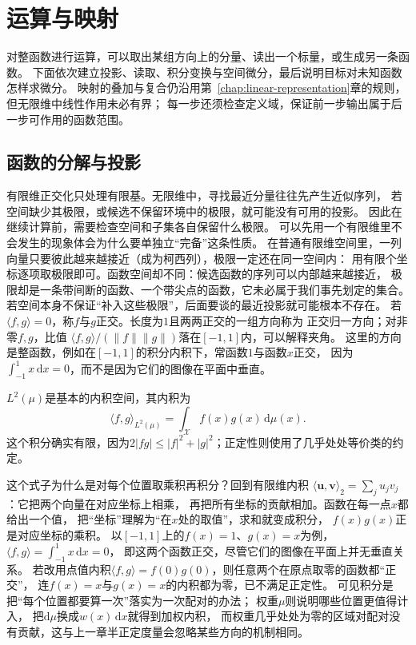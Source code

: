 \section{运算与映射}
\label{sec:functional-operators}

对整函数进行运算，可以取出某组方向上的分量、读出一个标量，或生成另一条函数。
下面依次建立投影、读取、积分变换与空间微分，最后说明目标对未知函数怎样求微分。
映射的叠加与复合仍沿用第~\ref{chap:linear-representation}章的规则，但无限维中线性作用未必有界；
每一步还须检查定义域，保证前一步输出属于后一步可作用的函数范围。

\subsection{函数的分解与投影}
\label{sec:functional-decomposition-projection}
\label{sec:functional-orthogonal-expansions-projections}

\label{sec:functional-projection-approximation}

有限维正交化只处理有限基。无限维中，寻找最近分量往往先产生近似序列，
若空间缺少其极限，或候选不保留环境中的极限，就可能没有可用的投影。
因此在继续计算前，需要检查空间和子集各自保留什么极限。
可以先用一个有限维里不会发生的现象体会为什么要单独立“完备”这条性质。
在普通有限维空间里，一列向量只要彼此越来越接近（成为柯西列），极限一定还在同一空间内：
用有限个坐标逐项取极限即可。函数空间却不同：候选函数的序列可以内部越来越接近，
极限却是一条带间断的函数、一个带尖点的函数，它未必属于我们事先划定的集合。
若空间本身不保证“补入这些极限”，后面要谈的最近投影就可能根本不存在。
若$\langle f,g\rangle=0$，称$f$与$g$正交。长度为$1$且两两正交的一组方向称为
正交归一方向；对非零$f,g$，比值
$\langle f,g\rangle/(\lVert f\rVert\lVert g\rVert)$落在$[-1,1]$内，可以解释夹角。
这里的方向是整函数，例如在$[-1,1]$的积分内积下，常函数$1$与函数$x$正交，
因为$\int_{-1}^1x\,\mathrm dx=0$，而不是因为它们的图像在平面中垂直。

$L^2(\mu)$是基本的内积空间，其内积为
\[
  \langle f,g\rangle_{L^2(\mu)}
  =\int_{\mathcal{X}}f(x)g(x)\,\mathrm{d}\mu(x).
\]
这个积分确实有限，因为$2|fg|\leq |f|^2+|g|^2$；正定性则使用了几乎处处等价类的约定。

这个式子为什么是对每个位置取乘积再积分？回到有限维内积
$\langle\bm u,\bm v\rangle_2=\sum_j u_jv_j$：它把两个向量在对应坐标上相乘，
再把所有坐标的贡献相加。函数在每一点$x$都给出一个值，
把“坐标”理解为“在$x$处的取值”，求和就变成积分，
$f(x)g(x)$正是对应坐标的乘积。
以$[-1,1]$上的$f(x)=1$、$g(x)=x$为例，
$\langle f,g\rangle=\int_{-1}^{1}x\,\mathrm dx=0$，
即这两个函数正交，尽管它们的图像在平面上并无垂直关系。
若改用点值内积$\langle f,g\rangle=f(0)g(0)$，则任意两个在原点取零的函数都“正交”，
连$f(x)=x$与$g(x)=x$的内积都为零，已不满足正定性。
可见积分是把“每个位置都要算一次”落实为一次配对的办法；
权重$\mu$则说明哪些位置更值得计入，
把$\mathrm d\mu$换成$w(x)\,\mathrm dx$就得到加权内积，
而权重几乎处处为零的区域对配对没有贡献，这与上一章半正定度量会忽略某些方向的机制相同。

